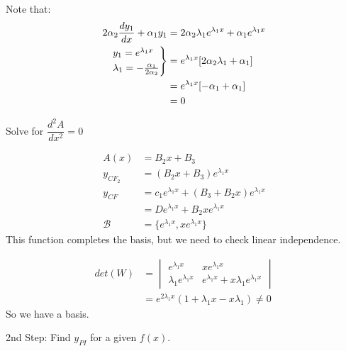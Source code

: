 \documentclass[twoside]{scrartcl}
\begin{document}
Note that: 
\[
\begin{aligned}
  2\alpha_2\frac{dy_1}{dx} +\alpha_1y_1 &= 2\alpha_2\lambda_1e^{\lambda_1x} + \alpha_1e^{\lambda_1x}\\
  \begin{rcases*}
  y_1 = e^{\lambda_1x}\\
  \lambda_1 = -\frac{\alpha_1}{2\alpha_2}	
  \end{rcases*}
  &= e^{\lambda_1x}[2\alpha_2\lambda_1 + \alpha_1]\\
  &= e^{\lambda_1x}[-\alpha_1+\alpha_1]\\
  &= 0
\end{aligned}
\]

Solve for $\dfrac{d^2A}{dx^2} = 0$

\[
\begin{aligned}
  A(x) &= B_2x + B_3\\
  y_{CF_2} &= (B_2x + B_3)e^{\lambda_1x}\\
  y_{CF} &= c_1e^{\lambda_1x} + (B_3 + B_2x)e^{\lambda_1x}\\
  &= De^{\lambda_1x} + B_2xe^{\lambda_1x}\\
  \mathcal{B} &= \{e^{\lambda_1x},xe^{\lambda_1x}\}
\end{aligned}
\]
This function completes the basis, but we need to check linear independence. 

\[
\begin{aligned}
  det(W) &= \begin{vmatrix}
  e^{\lambda_1x} & xe^{\lambda_1x}\\
  \lambda_1e^{\lambda_1x} & e^{\lambda_1x} + x\lambda_1e^{\lambda_1x}
  \end{vmatrix}\\
  &= e^{2\lambda_1x}(1+\lambda_1x - x\lambda_1) \neq 0
\end{aligned}
\]
So we have a basis. 

2nd Step: Find $y_{PI}$ for a given $f(x)$.\\
\end{document}

